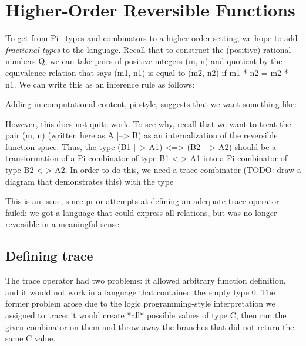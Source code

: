 \documentclass{sigplanconf}
\begin{document}
\section{Higher-Order Reversible Functions}

To get from {{Pi}}~\cite{James:2012:IE:2103656.2103667} types and combinators
to a higher order setting, we hope to add \emph{fractional types} to the
language. Recall that to construct the (positive) rational numbers {{Q}}, we
can take pairs of positive integers {{(m, n)}} and quotient by the
equivalence relation that says {{(m1, n1)}} is equal to {{(m2, n2)}} if 
{{m1 * n2 = m2 * n1}}. We can write this as an inference rule as follows:


\noindent
Adding in computational content, pi-style, suggests that we want something like:


\noindent
However, this does not quite work. To see why, recall that we want to treat the
pair {{(m, n)}} (written here as {{A |--> B}}) as an internalization of the
reversible function space. Thus, the type {{(B1 |--> A1) <=> (B2 |--> A2)}}
should be a transformation of a {{Pi}} combinator of type {{B1 <-> A1}} into a
{{Pi}} combinator of type {{B2 <-> A2}}. In order to do this, we need a trace
combinator (TODO: draw a diagram that demonstrates this) with the type


\noindent
This is an issue, since prior attempts at defining an adequate trace operator
failed: we got a language that could express all relations, but was no longer
reversible in a meaningful sense.

\subsection{Defining trace}

The trace operator had two problems: it allowed arbitrary function definition,
and it would not work in a language that contained the empty type {{0}}. The
former problem arose due to the logic programming-style interpretation we
assigned to trace: it would create *all* possible values of type {{C}}, then run
the given combinator on them and throw away the branches that did not return the
same {{C}} value.
\end{document}
